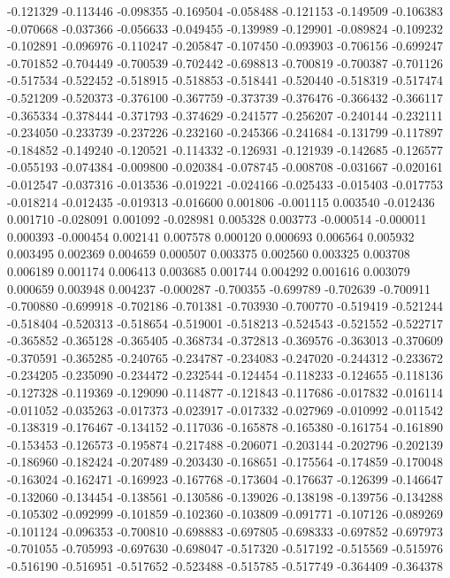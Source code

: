 -0.121329
-0.113446
-0.098355
-0.169504
-0.058488
-0.121153
-0.149509
-0.106383
-0.070668
-0.037366
-0.056633
-0.049455
-0.139989
-0.129901
-0.089824
-0.109232
-0.102891
-0.096976
-0.110247
-0.205847
-0.107450
-0.093903
-0.706156
-0.699247
-0.701852
-0.704449
-0.700539
-0.702442
-0.698813
-0.700819
-0.700387
-0.701126
-0.517534
-0.522452
-0.518915
-0.518853
-0.518441
-0.520440
-0.518319
-0.517474
-0.521209
-0.520373
-0.376100
-0.367759
-0.373739
-0.376476
-0.366432
-0.366117
-0.365334
-0.378444
-0.371793
-0.374629
-0.241577
-0.256207
-0.240144
-0.232111
-0.234050
-0.233739
-0.237226
-0.232160
-0.245366
-0.241684
-0.131799
-0.117897
-0.184852
-0.149240
-0.120521
-0.114332
-0.126931
-0.121939
-0.142685
-0.126577
-0.055193
-0.074384
-0.009800
-0.020384
-0.078745
-0.008708
-0.031667
-0.020161
-0.012547
-0.037316
-0.013536
-0.019221
-0.024166
-0.025433
-0.015403
-0.017753
-0.018214
-0.012435
-0.019313
-0.016600
0.001806
-0.001115
0.003540
-0.012436
0.001710
-0.028091
0.001092
-0.028981
0.005328
0.003773
-0.000514
-0.000011
0.000393
-0.000454
0.002141
0.007578
0.000120
0.000693
0.006564
0.005932
0.003495
0.002369
0.004659
0.000507
0.003375
0.002560
0.003325
0.003708
0.006189
0.001174
0.006413
0.003685
0.001744
0.004292
0.001616
0.003079
0.000659
0.003948
0.004237
-0.000287
-0.700355
-0.699789
-0.702639
-0.700911
-0.700880
-0.699918
-0.702186
-0.701381
-0.703930
-0.700770
-0.519419
-0.521244
-0.518404
-0.520313
-0.518654
-0.519001
-0.518213
-0.524543
-0.521552
-0.522717
-0.365852
-0.365128
-0.365405
-0.368734
-0.372813
-0.369576
-0.363013
-0.370609
-0.370591
-0.365285
-0.240765
-0.234787
-0.234083
-0.247020
-0.244312
-0.233672
-0.234205
-0.235090
-0.234472
-0.232544
-0.124454
-0.118233
-0.124655
-0.118136
-0.127328
-0.119369
-0.129090
-0.114877
-0.121843
-0.117686
-0.017832
-0.016114
-0.011052
-0.035263
-0.017373
-0.023917
-0.017332
-0.027969
-0.010992
-0.011542
-0.138319
-0.176467
-0.134152
-0.117036
-0.165878
-0.165380
-0.161754
-0.161890
-0.153453
-0.126573
-0.195874
-0.217488
-0.206071
-0.203144
-0.202796
-0.202139
-0.186960
-0.182424
-0.207489
-0.203430
-0.168651
-0.175564
-0.174859
-0.170048
-0.163024
-0.162471
-0.169923
-0.167768
-0.173604
-0.176637
-0.126399
-0.146647
-0.132060
-0.134454
-0.138561
-0.130586
-0.139026
-0.138198
-0.139756
-0.134288
-0.105302
-0.092999
-0.101859
-0.102360
-0.103809
-0.091771
-0.107126
-0.089269
-0.101124
-0.096353
-0.700810
-0.698883
-0.697805
-0.698333
-0.697852
-0.697973
-0.701055
-0.705993
-0.697630
-0.698047
-0.517320
-0.517192
-0.515569
-0.515976
-0.516190
-0.516951
-0.517652
-0.523488
-0.515785
-0.517749
-0.364409
-0.364378

